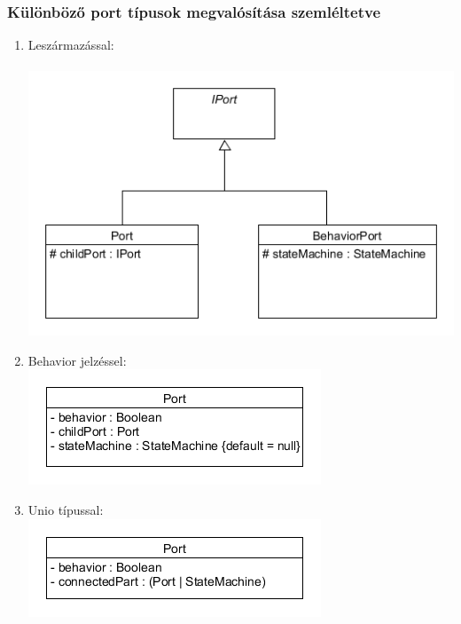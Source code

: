 \documentclass[a4paper,12pt]{report}
\begin{document}
\subsubsection{Különböző port típusok megvalósítása szemléltetve}
\begin{enumerate}
\item Leszármazással: \\\\
\includegraphics[scale=0.7]{behav_generalport_diag.png} \\

\item Behavior jelzéssel: \\
\includegraphics[scale=0.7]{simple_port_diag.png}

\item Unio típussal: \\
\includegraphics[scale=0.7]{unio_port_diag.png}
\end{enumerate}
\end{document}
